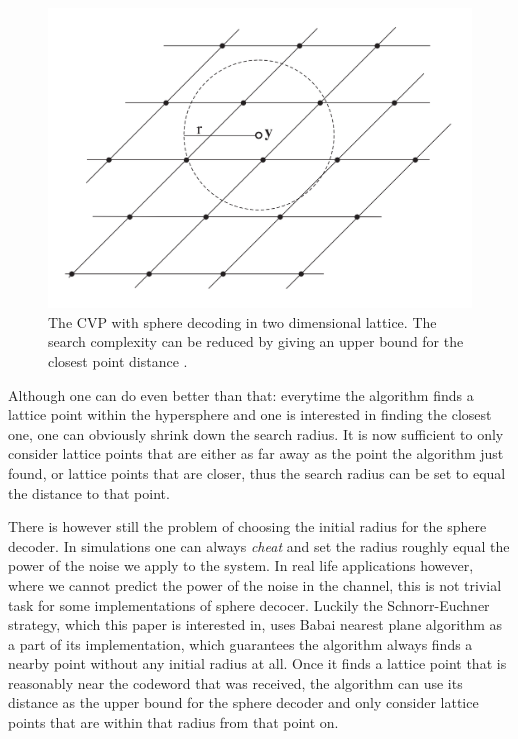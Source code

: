 \documentclass[english,12pt,a4paper,pdftex,sci,utf8]{aaltothesis}
\begin{document}
\begin{figure}[ht]
  \centering
  \includegraphics[width=0.8\linewidth]{sphere_decoder}
  \caption{The CVP with sphere decoding in two dimensional lattice. The search complexity can be reduced by giving an upper bound for the closest point distance \cite{mia}.}
  \label{fig:sphere}
\end{figure}

Although one can do even better than that: everytime the algorithm finds a lattice point within the hypersphere and one is interested in finding the closest one, one can obviously shrink down the search radius. It is now sufficient to only consider lattice points that are either as far away as the point the algorithm just found, or lattice points that are closer, thus the search radius can be set to equal the distance to that point.
\par There is however still the problem of choosing the initial radius for the sphere decoder. In simulations one can always \emph{cheat} and set the radius roughly equal the power of the noise we apply to the system. In real life applications however, where we cannot predict the power of the noise in the channel, this is not trivial task for some implementations of sphere decocer. Luckily the Schnorr-Euchner strategy, which this paper is interested in, uses Babai nearest plane algorithm as a part of its implementation, which guarantees the algorithm always finds a nearby point without any initial radius at all. Once it finds a lattice point that is reasonably near the codeword that was received, the algorithm can use its distance as the upper bound for the sphere decoder and only consider lattice points that are within that radius from that point on.
\end{document}
